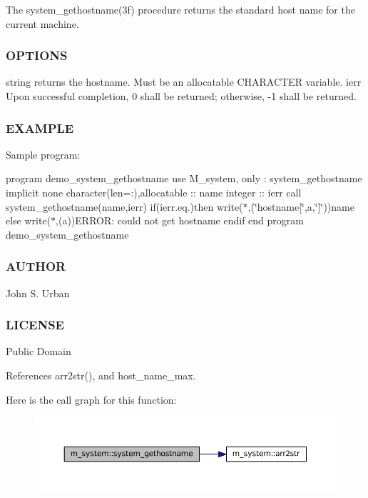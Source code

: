The system\+\_\+gethostname(3f) procedure returns the standard host name for the current machine.

\subsubsection*{O\+P\+T\+I\+O\+NS}

string returns the hostname. Must be an allocatable C\+H\+A\+R\+A\+C\+T\+ER variable. ierr Upon successful completion, 0 shall be returned; otherwise, -\/1 shall be returned. \subsubsection*{E\+X\+A\+M\+P\+LE}

Sample program\+:

program demo\+\_\+system\+\_\+gethostname use M\+\_\+system, only \+: system\+\_\+gethostname implicit none character(len=\+:),allocatable \+:\+: name integer \+:\+: ierr call system\+\_\+gethostname(name,ierr) if(ierr.\+eq.)then write($\ast$,\textquotesingle{}(\char`\"{}hostname\mbox{[}\char`\"{},a,\char`\"{}\mbox{]}\char`\"{})\textquotesingle{})name else write($\ast$,\textquotesingle{}(a)\textquotesingle{})\textquotesingle{}E\+R\+R\+OR\+: could not get hostname\textquotesingle{} endif end program demo\+\_\+system\+\_\+gethostname

\subsubsection*{A\+U\+T\+H\+OR}

John S. Urban \subsubsection*{L\+I\+C\+E\+N\+SE}

Public Domain 

References arr2str(), and host\+\_\+name\+\_\+max.

Here is the call graph for this function\+:\nopagebreak
\begin{figure}[H]
\begin{center}
\leavevmode
\includegraphics[width=350pt]{namespacem__system_a96fab225737afb77ff1cbba9866f0d05_cgraph}
\end{center}
\end{figure}
\mbox{\label{namespacem__system_a70f78645a1f130734005e190d469529d}} 
